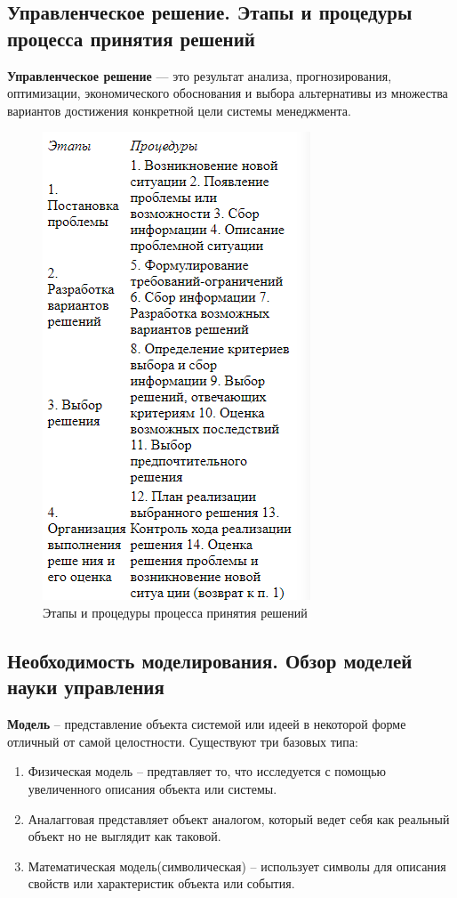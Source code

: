 \documentclass[a4paper,12pt,oneside,final]{extarticle}
\makeatletter
\numberwithin{equation}{section}
\def\maxwidth#1{\ifdim\Gin@nat@width>#1 #1\else\Gin@nat@width\fi}
\makeatother
\begin{document}
\subsection{Управленческое решение. Этапы и процедуры процесса принятия решений}
\textbf{Управленческое решение} --- это результат анализа, прогнозирования, оптимизации, экономического обоснования и выбора альтернативы из множества вариантов достижения конкретной цели системы менеджмента.
\begin{figure}[h]
	\centering
	\includegraphics[width=\maxwidth{\textwidth}]{management-figures/phases_and_procedures_of_mananegent_decision}
	\caption{Этапы и процедуры процесса принятия решений}
\end{figure}

\subsection{Необходимость моделирования. Обзор моделей науки управления}
\textbf{Модель} – представление объекта системой или идеей в некоторой форме отличный от самой целостности. 
Существуют три базовых типа:
\begin{enumerate}
	\item Физическая модель – предтавляет то, что исследуется с помощью увеличенного описания объекта или системы.
	\item Аналагговая представляет объект аналогом, который ведет себя как реальный объект но не выглядит как таковой. 
	\item Математическая модель(символическая) – использует символы для описания свойств или характеристик объекта или события. 
\end{enumerate}
\end{document}
